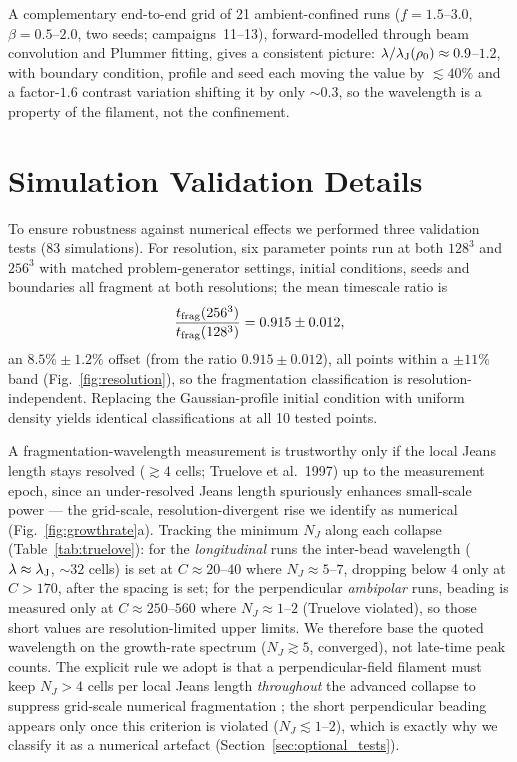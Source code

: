 \documentclass[usenatbib,twoside,twocolumn]{mnras}
\begin{document}
A complementary end-to-end grid of 21 ambient-confined runs ($f=1.5$--$3.0$, $\beta=0.5$--$2.0$, two seeds; campaigns~11--13), forward-modelled through beam convolution and Plummer fitting, gives a consistent picture: $\lambda/\lambda_{\rm J}(\rho_0)\approx0.9$--$1.2$, with boundary condition, profile and seed each moving the value by $\lesssim40\%$ and a factor-$1.6$ contrast variation shifting it by only $\sim0.3$, so the wavelength is a property of the filament, not the confinement.


\section{Simulation Validation Details}
\label{sec:validation}

To ensure robustness against numerical effects we performed three validation tests (83 simulations). For resolution, six parameter points run at both $128^3$ and $256^3$ with matched problem-generator settings, initial conditions, seeds and boundaries all fragment at both resolutions; the mean timescale ratio is
\begin{equation}
\frac{t_{\rm frag}(256^3)}{t_{\rm frag}(128^3)} = 0.915 \pm 0.012,
\end{equation}
an $8.5\%\pm1.2\%$ offset (from the ratio $0.915\pm0.012$), all points within a $\pm11\%$ band (Fig.~\ref{fig:resolution}), so the fragmentation classification is resolution-independent. Replacing the Gaussian-profile initial condition with uniform density yields identical classifications at all 10 tested points.

A fragmentation-wavelength measurement is trustworthy only if the local Jeans length stays resolved ($\gtrsim4$ cells; Truelove et al.\ 1997) up to the measurement epoch, since an under-resolved Jeans length spuriously enhances small-scale power --- the grid-scale, resolution-divergent rise we identify as numerical (Fig.~\ref{fig:growthrate}a). Tracking the minimum $N_J$ along each collapse (Table~\ref{tab:truelove}): for the \emph{longitudinal} runs the inter-bead wavelength ($\lambda\approx\lambda_{\rm J}$, $\sim32$ cells) is set at $C\approx20$--$40$ where $N_J\approx5$--$7$, dropping below 4 only at $C>170$, after the spacing is set; for the perpendicular \emph{ambipolar} runs, beading is measured only at $C\approx250$--$560$ where $N_J\approx1$--$2$ (Truelove violated), so those short values are resolution-limited upper limits. We therefore base the quoted wavelength on the growth-rate spectrum ($N_J\gtrsim5$, converged), not late-time peak counts. The explicit rule we adopt is that a perpendicular-field filament must keep $N_J>4$ cells per local Jeans length \emph{throughout} the advanced collapse to suppress grid-scale numerical fragmentation \citep{Truelove1997}; the short perpendicular beading appears only once this criterion is violated ($N_J\lesssim1$--$2$), which is exactly why we classify it as a numerical artefact (Section~\ref{sec:optional_tests}).
\end{document}
